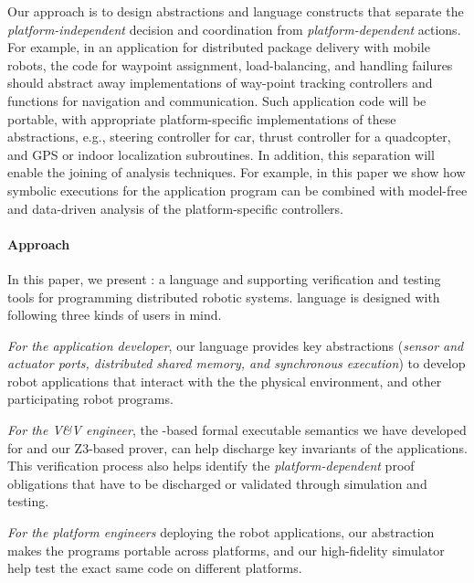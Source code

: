 Our approach is to design abstractions and language constructs that separate the \emph{platform-independent} decision and coordination from \emph{platform-dependent} actions.
For example, in an application for distributed package delivery with mobile robots,
the code for waypoint assignment, load-balancing, and handling failures should abstract away implementations of way-point tracking controllers and functions for navigation and communication.
Such application code will be portable, with appropriate platform-specific implementations of these abstractions,
e.g., steering controller for car, thrust controller for a quadcopter, and GPS or indoor localization subroutines.
%
In addition, this separation will enable the joining of analysis techniques.
For example, in this paper we show how symbolic executions for the application program can be combined with model-free and data-driven analysis of the platform-specific controllers.


\paragraph{Approach}
In this paper, we present \lgname: a language and supporting verification and testing tools for programming distributed robotic systems.
\lgname language is designed with following three kinds of users in mind.
\begin{noinditem}
\item \emph{For the application developer}, our \lgname language provides key abstractions (\emph{sensor and actuator ports, distributed shared memory, and synchronous execution})
      to develop robot applications that interact with the the physical environment, and other participating robot programs.
\item \emph{For the V\&V engineer}, the \K-based formal executable semantics we have developed for \lgname and our Z3-based prover,
      can help discharge key invariants of the \lgname applications.
      This verification process also helps identify the \emph{platform-dependent} proof obligations that have to be discharged or validated through simulation and testing.
\item \emph{For the platform engineers} deploying the robot applications, our abstraction makes the \lgname programs portable across platforms,
      and our high-fidelity \lgname simulator help test the exact same code on different platforms.
\end{noinditem}

